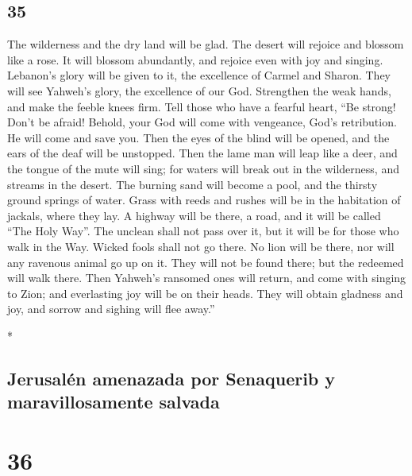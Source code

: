 \begin{paracol}{2}
\begin{otherlanguage}{english}
\hypertarget{section-69}{%
\section{35}\label{section-69}}

 The wilderness and the dry land will be glad. The desert
will rejoice and blossom like a rose.  It will blossom
abundantly, and rejoice even with joy and singing. Lebanon's glory will
be given to it, the excellence of Carmel and Sharon. They will see
Yahweh's glory, the excellence of our God.  Strengthen the
weak hands, and make the feeble knees firm.  Tell those
who have a fearful heart, ``Be strong! Don't be afraid! Behold, your God
will come with vengeance, God's retribution. He will come and save you.
 Then the eyes of the blind will be opened, and the ears
of the deaf will be unstopped.  Then the lame man will
leap like a deer, and the tongue of the mute will sing; for waters will
break out in the wilderness, and streams in the desert. 
The burning sand will become a pool, and the thirsty ground springs of
water. Grass with reeds and rushes will be in the habitation of jackals,
where they lay.  A highway will be there, a road, and it
will be called ``The Holy Way''. The unclean shall not pass over it, but
it will be for those who walk in the Way. Wicked fools shall not go
there.  No lion will be there, nor will any ravenous
animal go up on it. They will not be found there; but the redeemed will
walk there.  Then Yahweh's ransomed ones will return, and
come with singing to Zion; and everlasting joy will be on their heads.
They will obtain gladness and joy, and sorrow and sighing will flee
away.''

\end{otherlanguage}

\switchcolumn[0]*

\hypertarget{jerusaluxe9n-amenazada-por-senaquerib-y-maravillosamente-salvada}{%
\subsection{Jerusalén amenazada por Senaquerib y maravillosamente
salvada}\label{jerusaluxe9n-amenazada-por-senaquerib-y-maravillosamente-salvada}}

\hypertarget{section-70}{%
\section{36}\label{section-70}}


\end{paracol}
